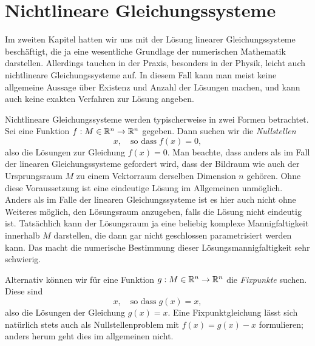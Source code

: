 % 

\chapter{Nichtlineare Gleichungssysteme}

Im zweiten Kapitel hatten wir uns mit der Lösung linearer
Gleichungssysteme beschäftigt, die ja eine wesentliche Grundlage der
numerischen Mathematik darstellen. Allerdings tauchen in der Praxis,
besonders in der Physik, leicht auch nichtlineare Gleichungssysteme
auf. In diesem Fall kann man meist keine allgemeine Aussage über
Existenz und Anzahl der Lösungen machen, und kann auch keine exakten
Verfahren zur Lösung angeben.

Nichtlineare Gleichungssysteme werden typischerweise in zwei Formen
betrachtet. Sei eine Funktion $f:M\in\mathbb{R}^n\to\mathbb{R}^n$ gegeben. Dann suchen
wir die \emph{Nullstellen}
\begin{equation}
  \label{eq:nullstellen}
  x, \quad\text{so dass}\; f(x) = 0,
\end{equation}
also die Lösungen zur Gleichung $f(x) = 0$. Man beachte, dass anders
als im Fall der linearen Gleichungssysteme gefordert wird, dass der
Bildraum wie auch der Ursprungsraum $M$ zu einem Vektorraum derselben
Dimension $n$ gehören. Ohne diese Voraussetzung ist eine eindeutige
Lösung im Allgemeinen unmöglich. Anders als im Falle der linearen
Gleichungssysteme ist es hier auch nicht ohne Weiteres möglich, den
Lösungsraum anzugeben, falls die Lösung nicht eindeutig
ist. Tatsächlich kann der Lösungsraum ja eine beliebig komplexe
Mannigfaltigkeit innerhalb $M$ darstellen, die dann gar nicht
geschlossen parametrisiert werden kann. Das macht die numerische
Bestimmung dieser Lösungsmannigfaltigkeit sehr schwierig.

Alternativ können wir für eine Funktion $g:M\in\mathbb{R}^n\to\mathbb{R}^n$ die
\emph{Fixpunkte} suchen. Diese sind
\begin{equation}
  \label{eq:fixpunkt}
  x, \quad\text{so dass}\; g(x) = x,
\end{equation}
also die Lösungen der Gleichung $g(x) = x$. Eine Fixpunktgleichung
lässt sich natürlich stets auch als Nullstellenproblem mit $f(x) =
g(x) - x$ formulieren; anders herum geht dies im allgemeinen nicht.

